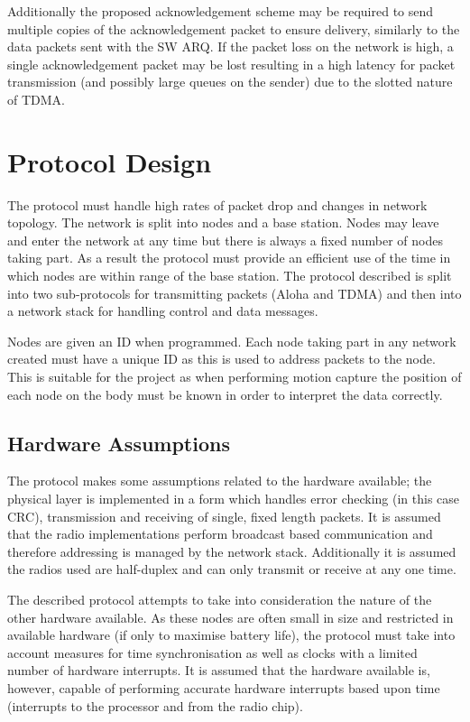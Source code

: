 \documentclass[parskip]{cs4rep}
\begin{document}
Additionally the proposed acknowledgement scheme may be required to send multiple copies of the acknowledgement packet to ensure delivery, similarly to the data packets sent with the SW ARQ. If the packet loss on the network is high, a single acknowledgement packet may be lost resulting in a high latency for packet transmission (and possibly large queues on the sender) due to the slotted nature of TDMA.

\chapter{Protocol Design}

The protocol must handle high rates of packet drop and changes in network topology. The network is split into nodes and a base station. Nodes may leave and enter the network at any time but there is always a fixed number of nodes taking part. As a result the protocol must provide an efficient use of the time in which nodes are within range of the base station. The protocol described is split into two sub-protocols for transmitting packets (Aloha and TDMA) and then into a network stack for handling control and data messages.

Nodes are given an ID when programmed. Each node taking part in any network created must have a unique ID as this is used to address packets to the node. This is suitable for the project as when performing motion capture the position of each node on the body must be known in order to interpret the data correctly.

\section{Hardware Assumptions}

The protocol makes some assumptions related to the hardware available; the physical layer is implemented in a form which handles error checking (in this case CRC), transmission and receiving of single, fixed length packets. It is assumed that the radio implementations perform broadcast based communication and therefore addressing is managed by the network stack. Additionally it is assumed the radios used are half-duplex and can only transmit or receive at any one time.

The described protocol attempts to take into consideration the nature of the other hardware available. As these nodes are often small in size and restricted in available hardware (if only to maximise battery life), the protocol must take into account measures for time synchronisation as well as clocks with a limited number of hardware interrupts. It is assumed that the hardware available is, however, capable of performing accurate hardware interrupts based upon time (interrupts to the processor and from the radio chip).
\end{document}
